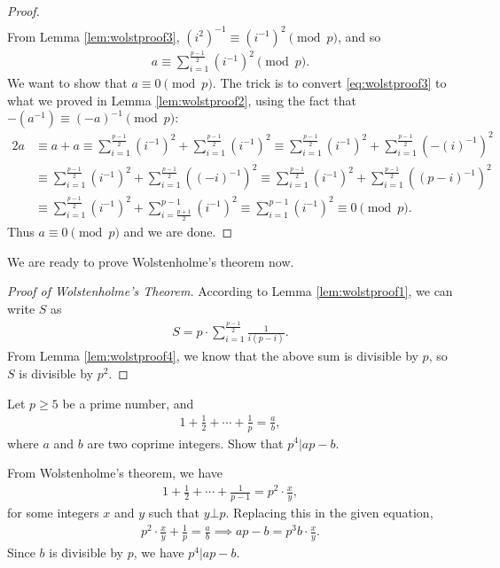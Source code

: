 \documentclass[12pt]{subfile}
\begin{document}
\begin{proof}
\begin{align*}
				\end{align*}
			From Lemma \ref{lem:wolstproof3},  $(i^2)^{-1} \equiv (i^{-1})^{2} \pmod p$, and so
				\begin{align}\label{eq:wolstproof3}
					a \equiv \sum_{i=1}^{\frac{p-1}{2}} (i^{-1})^{2} \pmod p.
				\end{align}
			We want to show that $a \equiv 0 \pmod p$. The trick is to convert \eqref{eq:wolstproof3} to what we proved in Lemma \ref{lem:wolstproof2}, using the fact that $-(a^{-1}) \equiv (-a)^{-1} \pmod p$:
				\begin{align*}
					2a &\equiv a+a \equiv \sum_{i=1}^{\frac{p-1}{2}} (i^{-1})^{2} + \sum_{i=1}^{\frac{p-1}{2}} (i^{-1})^{2} \equiv \sum_{i=1}^{\frac{p-1}{2}} (i^{-1})^{2} + \sum_{i=1}^{\frac{p-1}{2}} (-(i)^{-1})^{2}  \\
					&\equiv \sum_{i=1}^{\frac{p-1}{2}} (i^{-1})^{2} + \sum_{i=1}^{\frac{p-1}{2}} ((-i)^{-1})^{2}\equiv \sum_{i=1}^{\frac{p-1}{2}} (i^{-1})^{2} + \sum_{i=1}^{\frac{p-1}{2}} ((p-i)^{-1})^{2}\\
					& \equiv \sum_{i=1}^{\frac{p-1}{2}} (i^{-1})^{2} + \sum_{i=\frac{p+1}{2}}^{p-1} (i^{-1})^{2} \equiv \sum_{i=1}^{p-1} (i^{-1})^{2} \equiv 0 \pmod p.
				\end{align*}
			Thus $a \equiv 0 \pmod p$ and we are done.
		\end{proof}
	We are ready to prove Wolstenholme's theorem now.
		\begin{proof}[Proof of Wolstenholme's Theorem]
			According to Lemma \ref{lem:wolstproof1}, we can write $S$ as
			\begin{align*}
				S= p \cdot \sum_{i=1}^{\frac{p-1}{2}} \frac{1}{i(p-i)}.
			\end{align*}
			From Lemma \ref{lem:wolstproof4}, we know that the above sum is divisible by $p$, so $S$ is divisible by $p^2$.
		\end{proof}
		
		\begin{problem}
			Let $p \geq 5$ be a prime number, and 
			\begin{align*}
			1 + \frac{1}{2} + \cdots + \frac{1}{p}=\frac{a}{b},
			\end{align*}
			where $a$ and $b$ are two coprime integers. Show that $p^4 | ap -b$.
		\end{problem}
		
		\begin{solution}
			From Wolstenholme's theorem, we have
				\begin{align*}
				1 + \frac{1}{2} + \cdots + \frac{1}{p-1}=p^2 \cdot \frac{x}{y},
				\end{align*}
			for some integers $x$ and $y$ such that $y \bot p$. Replacing this in the given equation,
				\begin{align*}
				p^2 \cdot \frac{x}{y}+ \frac{1}{p}=\frac{a}{b} \implies ap-b = p^3b \cdot \frac{x}{y}.
				\end{align*}
			Since $b$ is divisible by $p$, we have $p^4 | ap-b$.
			
		\end{solution}
	
\end{document}
